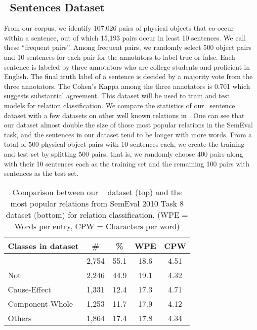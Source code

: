 \subsection{\lnear~Sentences Dataset}
\label{lsd}
From our corpus, we identify 107,026 pairs of physical objects that
co-occur within a sentence, out of which 
15,193 pairs occur in least 10 sentences.
We call these ``frequent pairs''.
Among frequent pairs, we randomly select 500 object pairs and 
10 sentences for each pair for the annotators to label true or false. 
Each sentence is labeled by three annotators who are college students
and proficient in English. The final truth label of a sentence is decided
by a majority vote from the three annotators. 
The Cohen's Kappa among the three annotators is 0.701 which suggests
substantial agreement. 
This dataset will be used to train and test models for relation
classification.
We compare the statistics of our \lnear\ sentence
dataset with a few datasets on other well known relations in 
.
One can see that our dataset almost double the size of those most
popular relations in the SemEval task, and the sentences in our
dataset tend to be longer with more words.
From a total of 500 physical object pairs with 10 sentences each, we create the training and test set by splitting 500 pairs, that is,
we randomly choose 400 pairs along with their 10 sentences each as the training set and the remaining 100 pairs with sentences as the test set.

\begin{table}[th]
	\centering
	\begin{tabular}{|l|c|c|c|c|} \hline
		Classes in dataset & \# & \% & WPE & CPW  \\ \hline \hline
		\lnear & 2,754 & 55.1 & 18.6 & 4.51  \\ \hline
		Not \lnear& 2,246 & 44.9 & 19.1 & 4.32  \\ \hline\hline
		Cause-Effect & 1,331  & 12.4 & 17.3 & 4.71\\ \hline
		Component-Whole &1,253 & 11.7 & 17.9 & 4.12 \\ \hline
		Others &1,864 & 17.4 & 17.8 & 4.34 \\ \hline
	\end{tabular}
	\caption{Comparison between our \lnear~ dataset (top) and 
		the most popular relations from SemEval 2010 Task 8 dataset (bottom) for relation classification. (WPE = Words per entry, CPW = Characters per word)}
	\label{tab:datasets}
\end{table}

